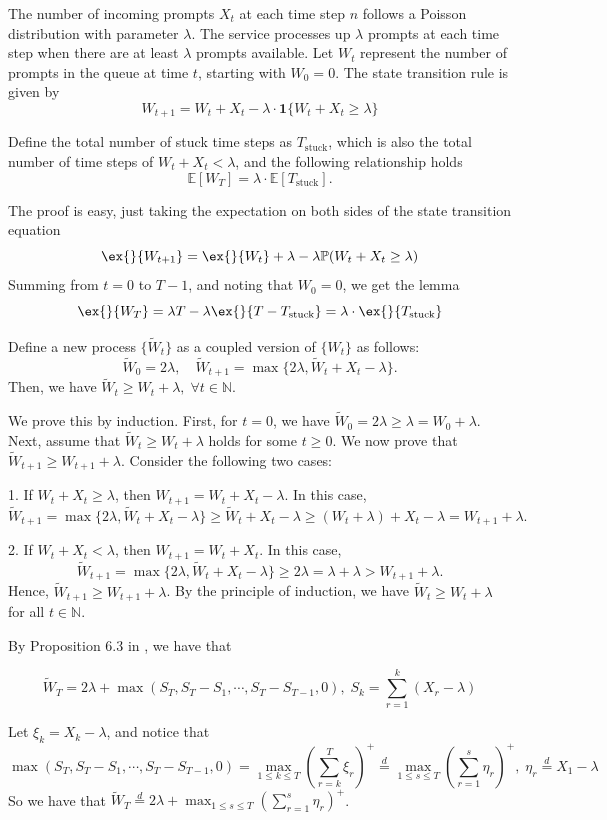 \documentclass[opre, nonblindrev]{informs3} %
\begin{document}
\begin{lemma}\label{throughput gap}
The number of incoming prompts $X_t$ at each time step $n$ follows a Poisson distribution with parameter $\lambda$. The service processes up $\lambda$ prompts at each time step when there are at least $\lambda$ prompts available. Let $W_t$ represent the number of prompts in the queue at time $t$, starting with $W_0=0$. The state transition rule is given by
$$W_{t+1}=W_t+X_t-\lambda\cdot \mathbf{1}\{W_t+X_t\geq \lambda\}$$

Define the total number of stuck time steps as $T_{\text{stuck}}$, which is also the total number of time steps of $W_t+X_t<\lambda$, and the following relationship holds
$$\mathbb{E}[W_T]= \lambda\cdot\mathbb{E}[T_{\text{stuck}}].$$
\end{lemma}
The proof is easy, just taking the expectation on both sides of the state transition equation
$$\ex{}{W_{t+1}}=\ex{}{W_t}+\lambda - \lambda \mathbb{P}(W_t+X_t\geq \lambda)$$
Summing from $t=0$ to $T-1$, and noting that $W_0=0$, we get the lemma
$$\ex{}{W_T}=\lambda T - \lambda \ex{}{T-T_{\text{stuck}}}=\lambda\cdot \ex{}{T_{\text{stuck}}}$$

\begin{lemma}\label{coupled process}
Define a new process $\{\tilde{W}_t\}$ as a coupled version of $\{W_t\}$ as follows:
$$
\tilde{W}_0 = 2\lambda, \quad \tilde{W}_{t+1} = \max\{ 2\lambda, \tilde{W}_t + X_t - \lambda \}.
$$
Then, we have $\tilde{W}_t \geq W_t + \lambda, \;\forall t\in \mathbb{N}$.
\end{lemma}
We prove this by induction. First, for $t = 0$, we have $\tilde{W}_0=2\lambda\geq \lambda=W_0+\lambda$. Next, assume that $\tilde{W}_t \geq W_t + \lambda$ holds for some $t \geq 0$. We now prove that $\tilde{W}_{t+1} \geq W_{t+1} + \lambda$. Consider the following two cases:

1. If $W_t + X_t \geq \lambda$, then $W_{t+1} = W_t + X_t - \lambda$. In this case,
$$\tilde{W}_{t+1}=\max\{ 2\lambda, \tilde{W}_t + X_t - \lambda \}\geq \tilde{W}_t + X_t - \lambda\geq( W_t+\lambda )+ X_t - \lambda=W_{t+1}+\lambda.$$

2. If $W_t + X_t < \lambda$, then $W_{t+1} = W_t + X_t$. In this case,
$$\tilde{W}_{t+1}=\max\{ 2\lambda, \tilde{W}_t + X_t - \lambda \}\geq 2\lambda = \lambda+\lambda>W_{t+1}+\lambda.$$
Hence, $\tilde{W}_{t+1} \geq W_{t+1} + \lambda$. By the principle of induction, we have $\tilde{W}_t \geq W_t + \lambda$ for all $t \in \mathbb{N}$.

By Proposition 6.3 in \cite{asmussen2003applied}, we have that 
\begin{lemma}
    $$\tilde{W}_T=2\lambda+\max(S_T, S_T-S_1,\cdots,S_T-S_{T-1},0),\; S_k=\sum_{r=1}^k (X_r-\lambda) $$
\end{lemma}
Let $\xi_k = X_k-\lambda$, and notice that 
$$\max(S_T, S_T-S_1,\cdots,S_T-S_{T-1},0)=\max_{1\leq k\leq T}(\sum_{r=k}^{T}\xi_r)^+\overset{d}{=}\max_{1\leq s\leq T}(\sum_{r=1}^{s}\eta_r)^+, \; \eta_r\overset{d}{=}X_1-\lambda$$
So we have that $\tilde{W}_T \overset{d}{=}2\lambda+\max_{1\leq s\leq T}(\sum_{r=1}^{s}\eta_r)^+ $. 
\end{document}

